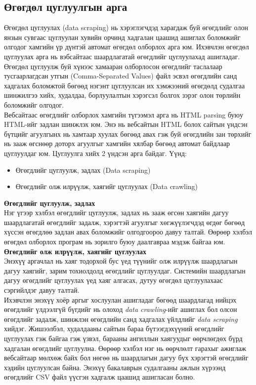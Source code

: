 \subsection{Өгөгдөл цуглуулгын арга}
Өгөгдөл цуглуулах (data scraping) нь хэрэглэгчдэд харагдаж буй өгөгдлийг олон янзын сувгаас цуглуулан хувийн орчинд хадгалан цаашид ашиглах боломжийг олгодог хамгийн үр дүнтэй автомат өгөгдөл олборлох арга юм. Ихэвчлэн өгөгдөл цуглуулах арга нь вэбсайтаас шаардлагатай өгөгдлийг цуглуулахад ашигладаг. Өгөгдөл цуглуулж буй хүнээс хамааран олборлосон өгөгдлийг таслалаар тусгаарлагдсан утгын (Comma-Separated Values) файл эсвэл өгөгдлийн санд хадгалах боломжтой бөгөөд нэгэнт цуглуулсан их хэмжээний өгөгдөлд судалгаа шинжилгээ хийх, худалдаа, борлуулалтын хэрэгсэл болгох зэрэг олон төрлийн боломжийг олгодог. 
\\ Вебсайтаас өгөгдлийг олборлох хамгийн түгээмэл арга нь HTML parsing буюу HTML-ийг задлан шинжлэх юм. Энэ нь вебсайтын HTML болох сайтын үндсэн бүтцийг агуулгынх нь хамтаар хуулах бөгөөд авах гэж буй өгөгдлийн зан төрхийг нь зааж өгснөөр доторх агуулгыг хамгийн хялбар бөгөөд автомат байдлаар цуглуулдаг юм. 
Цуглуулга хийх 2 үндсэн арга байдаг. Үүнд:
\begin{itemize}
  \item Өгөгдлийг цуглуулж, задлах (Data scraping)
  \item Өгөгдлийг олж илрүүлж, хаягийг цуглуулах (Data crawling)
\end{itemize}
\textbf{Өгөгдлийг цуглуулж, задлах}
\\Нэг үгээр хэлбэл өгөгдлийг цуглуулж, задлах нь зааж өгсөн хаягийн дагуу шаардлагатай өгөгдлийг задалж, хэрэгтэй агуулгыг хөгжүүлэгчдэд өгдөг бөгөөд хүссэн өгөгдлөө задлан авах боломжийг олгодгоороо давуу талтай. Өөрөөр хэлбэл өгөгдөл олборлох програм нь зорилго буюу даалгавраа мэдэж байгаа юм. 
\\\textbf{Өгөгдлийг олж илрүүлж, хаягийг цуглуулах}
\\Энэхүү аргачлал нь хаяг тодорхой бус үед түүнийг олж илрүүлж шаардлагын дагуу хаягийг, зарим тохиолдолд өгөгдлийг цуглуулдаг. Системийн шаардлагын дагуу өгөгдлийг цуглуулах үед хаяг алгасах, дутуу өгөгдөл цуглуулахаас сэргийлдэг давуу талтай. 
\\Ихэвчлэн энэхүү хоёр аргыг хослуулан ашигладаг бөгөөд шаардлагад нийцэх өгөгдлийг үлдээлгүй бүгдийг нь олоход \textit{data crawling}-ийг ашиглах бол олсон өгөгдлийг задалж, шинжлэн өгөгдлийн санд хадгалах үйлдлийг \textit{data scraping} хийдэг. Жишээлбэл, худалдааны сайтын бараа бүтээгдэхүүний өгөгдлийг цуглуулах гэж байгаа гэж үзвэл, барааны ангиллын хаягуудыг өөрчлөгдөх бүрд хадгалан өгөгдлийг цуглуулна. Өөрөөр хэлбэл нэг нь өөрчлөлт гарахыг ажиглаж вебсайтаар мөлхөж байх бол нөгөө нь шаардлагын дагуу бүх хэрэгтэй өгөгдлийг хэдийн цуглуулсан байна.  
Энэхүү бакалаврын судалгааны ажлын хүрээнд өгөгдлийг CSV файл үүсгэн хадгалж цаашид ашигласан болно. 
